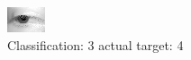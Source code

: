 \begin{figure}[h!]
\begin{center}
\includegraphics[width=0.60\columnwidth]{figures/ID2685_class_3_target_4.png}
\end{center}
\caption{ Classification: 3 actual target: 4}
\label{fig:ID2685_class_3_target_4}
\end{figure}
